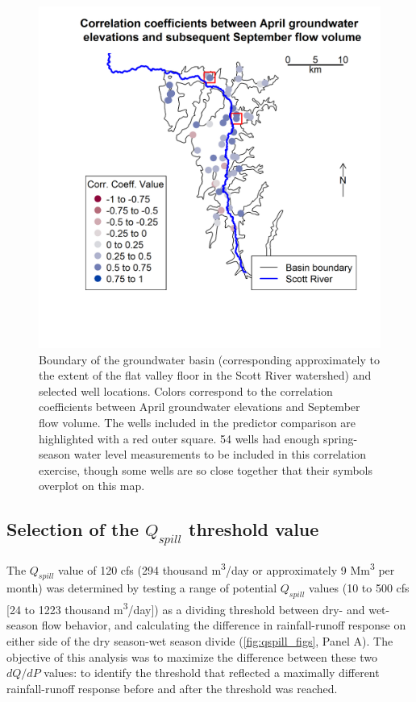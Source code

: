 \documentclass[hess, manuscript]{copernicus}
\begin{document}
\begin{figure}
\includegraphics[width=1\linewidth]{f09} \caption{\label{fig:gw_vs_fall_flows_corr_map} Boundary of the groundwater basin (corresponding approximately to the extent of the flat valley floor in the Scott River watershed) and selected well locations. Colors correspond to the correlation coefficients between April groundwater elevations and September flow volume. The wells included in the predictor comparison are highlighted with a red outer square. 54 wells had enough spring-season water level measurements to be included in this correlation exercise, though some wells are so close together that their symbols overplot on this map.}\label{fig:gw_vs_fall_flows_corr_map}
\end{figure}

\newpage

\subsection{\texorpdfstring{Selection of the \(Q_{spill}\) threshold
value}{Selection of the Q\_\{spill\} threshold value}}

The \(Q_{spill}\) value of 120 cfs (294 thousand
m\textsuperscript{3}/day or approximately 9 Mm\textsuperscript{3} per
month) was determined by testing a range of potential \(Q_{spill}\)
values (10 to 500 cfs {[}24 to 1223 thousand
m\textsuperscript{3}/day{]}) as a dividing threshold between dry- and
wet-season flow behavior, and calculating the difference in
rainfall-runoff response on either side of the dry season-wet season
divide (\autoref{fig:qspill_figs}, Panel A). The objective of this
analysis was to maximize the difference between these two \(dQ/dP\)
values: to identify the threshold that reflected a maximally different
rainfall-runoff response before and after the threshold was reached.
\end{document}
